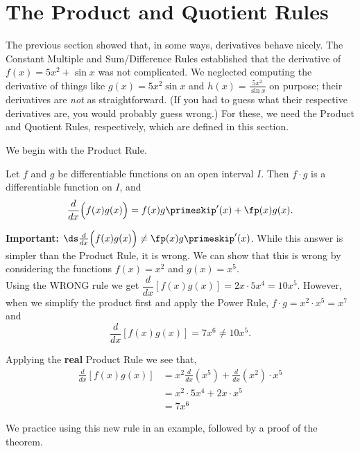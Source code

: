 \section{The Product and Quotient Rules}\label{sec:prod_quot_rules}

The previous section showed that, in some ways, derivatives behave nicely. The Constant Multiple and Sum/Difference Rules established that the derivative of $f(x) = 5x^2+\sin x $ was not complicated. We neglected computing the derivative of things like $g(x) = 5x^2\sin x$ and $h(x) = \frac{5x^2}{\sin x}$ on purpose; their derivatives are \emph{not} as straightforward. (If you had to guess what their respective derivatives are, you would probably guess wrong.) For these, we need the Product and Quotient Rules, respectively, which are defined in this section. 

We begin with the Product Rule.

\begin{theorem}\label{thm:ProductRule}
Let $f$ and $g$ be differentiable functions on an open interval $I$. Then $f\cdot g$ is a differentiable function on $I$, and \[\frac{d}{dx}\Bigl(f(x)g(x)\Bigr) = f(x)g\primeskip'(x) + \fp(x)g(x).\]
\end{theorem}

\textbf{Important:} $\ds\frac{d}{dx}\Bigl(f(x)g(x)\Bigr) \neq \fp(x)g\primeskip'(x)$. While this answer is simpler than the Product Rule, it is wrong.  We can show that this is wrong by considering the functions
$f(x)=x^2$ and $g(x)=x^5$. \\
Using the WRONG rule we get $\dfrac{d}{dx}[f(x)g(x)] =2x \cdot 5x^4 = 10x^5$. However, when we simplify the product first and apply the Power Rule, $f \cdot g = x^2 \cdot x^5 = x^7$ and 
\[\frac{d}{dx}[f(x)g(x)] = 7x^6 \neq 10x^5.\]

Applying the \textbf{real} Product Rule we see that,
\begin{align*}
\frac{d}{dx}[f(x)g(x)]
& = x^2 \frac{d}{dx} (x^5) + \frac{d}{dx} (x^2) \cdot x^5 \\ 
& = x^2 \cdot 5x^4+2x \cdot x^5 \\ 
&= 7x^6
\end{align*}


We practice using this new rule in an example, followed by a proof of the theorem.

